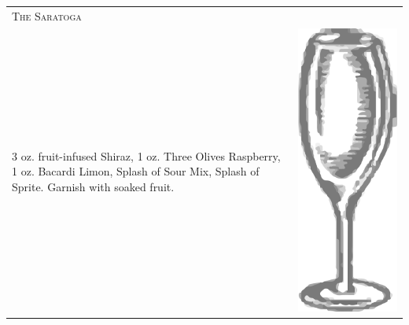 \documentclass{article}
\begin{document}
\begin{tabular}{p{2in} p{0.5in}}
\multicolumn{2}{p{3in}}{\centering\Huge\textsc{The Saratoga}} \\ 
  \vspace{-0.1in}3 oz. fruit-infused Shiraz, 1 oz. Three Olives Raspberry, 1 oz. Bacardi Limon, Splash of Sour Mix, Splash of Sprite. Garnish with soaked fruit. &
  \vspace{-0.1in} \includegraphics{wine_glass.png}
\end{tabular}
\end{document}
